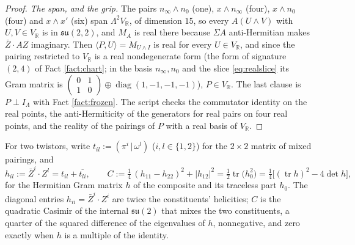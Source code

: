 \documentclass[11pt]{article}
\theoremstyle{definition}
\newcommand{\R}{\mathbb{R}}
\newcommand{\tr}{\operatorname{tr}}
\newcommand{\ip}[2]{\langle #1, #2\rangle}
\newcommand{\hp}[2]{( #1 \,|\, #2 )}
\begin{document}
\begin{proof}
\emph{The span, and the grip.} The pairs $n_{\infty}\wedge n_{0}$ (one), $x\wedge n_{\infty}$ (four), $x\wedge n_{0}$ (four) and $x\wedge x'$ (six) span $\Lambda^{2}V_{\R}$, of dimension $15$, so every $A(U\wedge V)$ with $U, V \in V_{\R}$ is in $\mathfrak{su}(2,2)$, and $M_{A}$ is real there because $\Sigma A$ anti-Hermitian makes $\bar{Z}\cdot AZ$ imaginary. Then $\ip{P}{U} = M_{U\wedge I}$ is real for every $U \in V_{\R}$, and since the pairing restricted to $V_{\R}$ is a real nondegenerate form (the form of signature $(2,4)$ of Fact \ref{fact:chart}; in the basis $n_{\infty}, n_{0}$ and the slice \eqref{eq:realslice} its Gram matrix is $\left(\begin{smallmatrix} 0 & 1 \\ 1 & 0\end{smallmatrix}\right) \oplus \operatorname{diag}(1,-1,-1,-1)$), $P \in V_{\R}$. The last clause is $P \perp I_{\Lambda}$ with Fact \ref{fact:frozen}. The script checks the commutator identity on the real points, the anti-Hermiticity of the generators for real pairs on four real points, and the reality of the pairings of $P$ with a real basis of $V_{\R}$.
\end{proof}

For two twistors, write $t_{il} := \hp{\pi^{i}}{\omega^{l}}$ ($i, l \in \{1,2\}$) for the $2 \times 2$ matrix of mixed pairings, and
\begin{equation}\label{eq:gram}
h_{il} := \bar{Z}^{i}\cdot Z^{l} = t_{il} + \overline{t_{li}}, \qquad
C := \tfrac14\,(h_{11} - h_{22})^{2} + |h_{12}|^{2} = \tfrac12\tr\bigl(h_{0}^{2}\bigr) = \tfrac14\bigl[(\tr h)^{2} - 4\det h\bigr],
\end{equation}
for the Hermitian Gram matrix $h$ of the composite and its traceless part $h_{0}$. The diagonal entries $h_{ii} = \bar{Z}^{i}\cdot Z^{i}$ are twice the constituents' helicities; $C$ is the quadratic Casimir of the internal $\mathfrak{su}(2)$ that mixes the two constituents, a quarter of the squared difference of the eigenvalues of $h$, nonnegative, and zero exactly when $h$ is a multiple of the identity.
\end{document}
